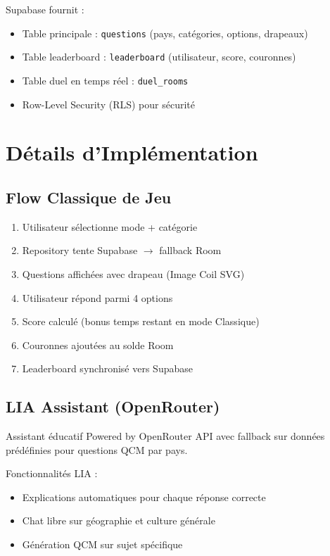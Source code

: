 \documentclass[12pt,a4paper,openany]{report}
\begin{document}
    Supabase fournit :
    \begin{itemize}
      \item Table principale : \texttt{questions} (pays, catégories, options, drapeaux)
      \item Table leaderboard : \texttt{leaderboard} (utilisateur, score, couronnes)
      \item Table duel en temps réel : \texttt{duel\_rooms}
      \item Row-Level Security (RLS) pour sécurité
    \end{itemize}

    \chapter{Détails d'Implémentation}

    \section{Flow Classique de Jeu}

    \begin{enumerate}
      \item Utilisateur sélectionne mode + catégorie
      \item Repository tente Supabase $\rightarrow$ fallback Room
      \item Questions affichées avec drapeau (Image Coil SVG)
      \item Utilisateur répond parmi 4 options
      \item Score calculé (bonus temps restant en mode Classique)
      \item Couronnes ajoutées au solde Room
      \item Leaderboard synchronisé vers Supabase
    \end{enumerate}

    \section{LIA Assistant (OpenRouter)}

    \begin{infobox}{Assistant éducatif}
    Powered by OpenRouter API avec fallback sur données prédéfinies pour questions QCM par pays.
    \end{infobox}

    Fonctionnalités LIA :
    \begin{itemize}
      \item Explications automatiques pour chaque réponse correcte
      \item Chat libre sur géographie et culture générale
      \item Génération QCM sur sujet spécifique
    \end{itemize}
\end{document}
